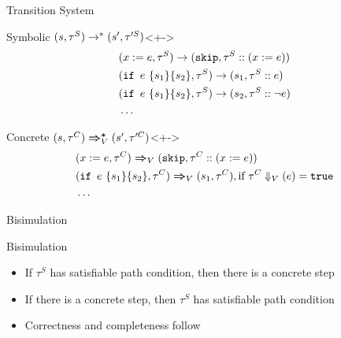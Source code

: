\documentclass{beamer}
\DeclareMathOperator{\ifs}{\mathtt{if}}
\DeclareMathOperator{\skips}{\mathtt{skip}}
\DeclareMathOperator{\true}{\mathtt{true}}
\newcommand{\accC}[2][V_0]{\ensuremath{#2\Downarrow_{#1}}}
\begin{document}
\begin{frame}{Transition System}
  \begin{block}{Symbolic $\Sstar{(s, \tau^{S})}{(s', \tau'^{S})}$}<+->
    \vspace{-3ex}
    \begin{align*}
      &\Sstep{(x := e, \tau^{S})}{(\skips, \tau^{S} :: (x :=  e))}\\
      &\Sstep{(\ifs~e~\{s_{1}\}\{s_{2}\}, \tau^{S})}{(s_{1}, \tau^{S} :: e)}\\
      &\Sstep{(\ifs~e~\{s_{1}\}\{s_{2}\}, \tau^{S})}{(s_{2}, \tau^{S} :: \neg e)}\\
      &\ldots
    \end{align*}
  \end{block}
  \begin{block}{Concrete $\Cstar[V]{(s, \tau^{C})}{(s', \tau'^{C})}$}<+->
    \vspace{-3ex}
    \begin{align*}
      &\Cstep[V]{(x := e, \tau^{C})}{(\skips, \tau^{C} :: (x := e))}\\
      &\Cstep[V]{(\ifs~e~\{s_{1}\}\{s_{2}\}, \tau^{C})}{(s_{1}, \tau^{C})}, \text{if } \accC[V]{\tau^C} (e) = \true\\
      &\ldots
    \end{align*}
  \end{block}
\end{frame}

\begin{frame}{Bisimulation}
  \begin{block}{Bisimulation}
    \begin{figure}
    \end{figure}
  \end{block}
  \begin{itemize}[<+->]
    \item If $\tau^{S}$ has satisfiable path condition, then there is a concrete step
    \item If there is a concrete step, then $\tau^{S}$ has satisfiable path condition
    \item Correctness and completeness follow
  \end{itemize}
\end{frame}
\end{document}
